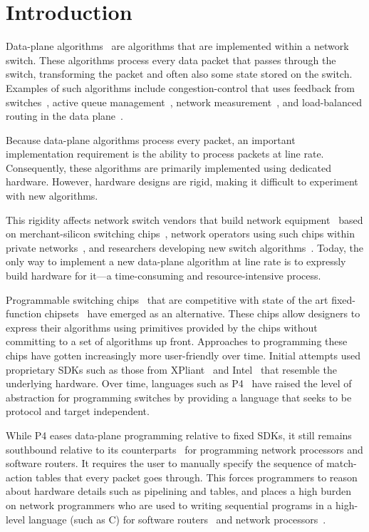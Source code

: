 \section{Introduction}
\label{s:intro}

Data-plane algorithms~\cite{cestan} are algorithms that are implemented within
a network switch. These algorithms process every data packet that passes
through the switch, transforming the packet and often also some state stored on
the switch.  Examples of such algorithms include congestion-control that uses
feedback from switches~\cite{xcp, rcp, pdq, dctcp}, active queue
management~\cite{codel}, network measurement~\cite{opensketch, bitmap_george,
elephant_george}, and load-balanced routing in the data plane~\cite{conga}.

Because data-plane algorithms process every packet, an important implementation
requirement is the ability to process packets at line rate.  Consequently,
these algorithms are primarily implemented using dedicated hardware. However,
hardware designs are rigid, making it difficult to experiment with new
algorithms.

This rigidity affects network switch vendors that build network
equipment~\cite{cisco_nexus, dell_force10, arista_7050} based on
merchant-silicon switching chips~\cite{trident, tomahawk, mellanox}, network
operators using such chips within private networks~\cite{google,facebook,vl2},
and researchers developing new switch algorithms~\cite{xcp, codel, d3, detail,
pdq}. Today, the only way to implement a new data-plane algorithm at line rate
is to expressly build hardware for it---a time-consuming and resource-intensive
process.

Programmable switching chips~\cite{flexpipe, xpliant, rmt} that are competitive
with state of the art fixed-function chipsets~\cite{trident, tomahawk,
mellanox} have emerged as an alternative.  These chips allow designers to
express their algorithms using primitives provided by the chips without
committing to a set of algorithms up front. Approaches to programming these
chips have gotten increasingly more user-friendly over time. Initial attempts
used proprietary SDKs such as those from XPliant~\cite{xpliant_sdk,
xpliant_sdk2} and Intel~\cite{intel_sdk} that resemble the underlying hardware.
Over time, languages such as P4~\cite{p4, p4spec} have raised the level of
abstraction for programming switches by providing a language that seeks to be
protocol and target independent.

While P4 eases data-plane programming relative to fixed SDKs, it still remains
southbound relative to its counterparts~\cite{packetc, nova, click} for
programming network processors and software routers. It requires the user to
manually specify the sequence of match-action tables that every packet goes
through. This forces programmers to reason about hardware details such as
pipelining and tables, and places a high burden on network programmers who are
used to writing sequential programs in a high-level language (such as C) for
software routers~\cite{click} and network processors~\cite{ixp4xx, ixp2800}.

